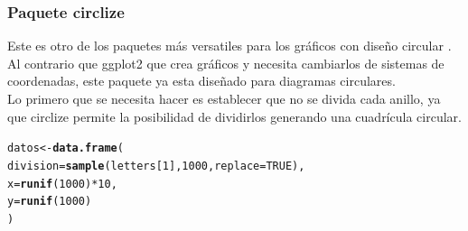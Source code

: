 \documentclass{article}\usepackage[]{graphicx}\usepackage[]{color}
\makeatletter
\newcommand{\hlnum}[1]{\textcolor[rgb]{0.686,0.059,0.569}{#1}}%
\newcommand{\hlopt}[1]{\textcolor[rgb]{0,0,0}{#1}}%
\newcommand{\hlstd}[1]{\textcolor[rgb]{0.345,0.345,0.345}{#1}}%
\newcommand{\hlkwb}[1]{\textcolor[rgb]{0.69,0.353,0.396}{#1}}%
\newcommand{\hlkwc}[1]{\textcolor[rgb]{0.333,0.667,0.333}{#1}}%
\newcommand{\hlkwd}[1]{\textcolor[rgb]{0.737,0.353,0.396}{\textbf{#1}}}%
\newenvironment{kframe}{%
 \def\at@end@of@kframe{}%
 \ifinner\ifhmode%
  \def\at@end@of@kframe{\end{minipage}}%
  \begin{minipage}{\columnwidth}%
 \fi\fi%
 \def\FrameCommand##1{\hskip\@totalleftmargin \hskip-\fboxsep
 \colorbox{shadecolor}{##1}\hskip-\fboxsep
     \hskip-\linewidth \hskip-\@totalleftmargin \hskip\columnwidth}%
 \MakeFramed {\advance\hsize-\width
   \@totalleftmargin\z@ \linewidth\hsize
   \@setminipage}}%
 {\par\unskip\endMakeFramed%
 \at@end@of@kframe}
\newenvironment{knitrout}{}{} %
\makeatother
\begin{document}
\subsubsection{Paquete circlize}
Este es otro de los paquetes m\'as versatiles para los gr\'aficos con dise\~no circular\cite{docu_circlize}
. Al contrario que ggplot2 que crea gr\'aficos y necesita cambiarlos de sistemas de coordenadas, este paquete ya esta dise\~nado para diagramas circulares.~\\
Lo primero que se necesita hacer es establecer que no se divida cada anillo, ya que circlize permite la posibilidad de dividirlos generando una cuadr\'icula circular.
\begin{knitrout}
\color{fgcolor}\begin{kframe}
\begin{alltt}
\hlstd{datos} \hlkwb{<-} \hlkwd{data.frame}\hlstd{(}
  \hlkwc{division} \hlstd{=} \hlkwd{sample}\hlstd{(letters[}\hlnum{1}\hlstd{],} \hlnum{1000}\hlstd{,} \hlkwc{replace} \hlstd{=} \hlnum{TRUE}\hlstd{),}
  \hlkwc{x} \hlstd{=} \hlkwd{runif}\hlstd{(}\hlnum{1000}\hlstd{)}\hlopt{*}\hlnum{10}\hlstd{,}
  \hlkwc{y} \hlstd{=} \hlkwd{runif}\hlstd{(}\hlnum{1000}\hlstd{)}
\hlstd{)}
\end{alltt}
\end{kframe}
\end{knitrout}
\end{document}
